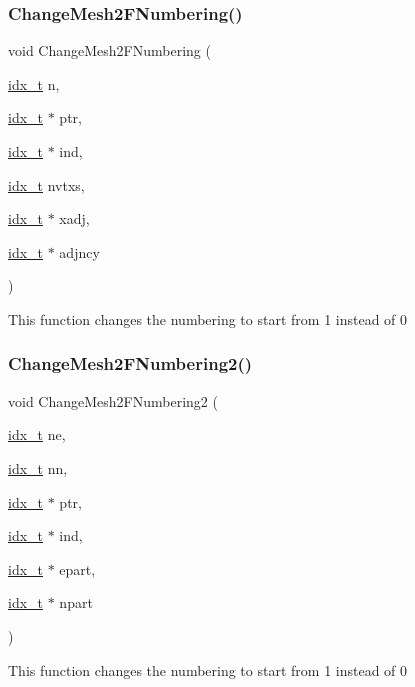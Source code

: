 \subsubsection{\texorpdfstring{Change\+Mesh2\+F\+Numbering()}{ChangeMesh2FNumbering()}}
{\footnotesize\ttfamily void Change\+Mesh2\+F\+Numbering (\begin{DoxyParamCaption}\item[{\hyperlink{a00876_aaa5262be3e700770163401acb0150f52}{idx\+\_\+t}}]{n,  }\item[{\hyperlink{a00876_aaa5262be3e700770163401acb0150f52}{idx\+\_\+t} $\ast$}]{ptr,  }\item[{\hyperlink{a00876_aaa5262be3e700770163401acb0150f52}{idx\+\_\+t} $\ast$}]{ind,  }\item[{\hyperlink{a00876_aaa5262be3e700770163401acb0150f52}{idx\+\_\+t}}]{nvtxs,  }\item[{\hyperlink{a00876_aaa5262be3e700770163401acb0150f52}{idx\+\_\+t} $\ast$}]{xadj,  }\item[{\hyperlink{a00876_aaa5262be3e700770163401acb0150f52}{idx\+\_\+t} $\ast$}]{adjncy }\end{DoxyParamCaption})}

This function changes the numbering to start from 1 instead of 0 \mbox{\label{a00200_a60a9b8fb9d30f771f5683615348a2079}} 
\subsubsection{\texorpdfstring{Change\+Mesh2\+F\+Numbering2()}{ChangeMesh2FNumbering2()}}
{\footnotesize\ttfamily void Change\+Mesh2\+F\+Numbering2 (\begin{DoxyParamCaption}\item[{\hyperlink{a00876_aaa5262be3e700770163401acb0150f52}{idx\+\_\+t}}]{ne,  }\item[{\hyperlink{a00876_aaa5262be3e700770163401acb0150f52}{idx\+\_\+t}}]{nn,  }\item[{\hyperlink{a00876_aaa5262be3e700770163401acb0150f52}{idx\+\_\+t} $\ast$}]{ptr,  }\item[{\hyperlink{a00876_aaa5262be3e700770163401acb0150f52}{idx\+\_\+t} $\ast$}]{ind,  }\item[{\hyperlink{a00876_aaa5262be3e700770163401acb0150f52}{idx\+\_\+t} $\ast$}]{epart,  }\item[{\hyperlink{a00876_aaa5262be3e700770163401acb0150f52}{idx\+\_\+t} $\ast$}]{npart }\end{DoxyParamCaption})}

This function changes the numbering to start from 1 instead of 0 